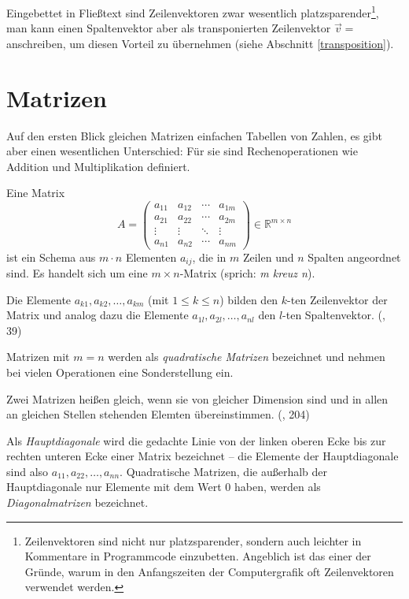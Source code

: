 Eingebettet in Fließtext sind Zeilenvektoren zwar wesentlich platzsparender\footnote{Zeilenvektoren sind nicht nur platzsparender, sondern auch leichter in Kommentare in 
Programmcode einzubetten. Angeblich ist das einer der Gründe, warum in den Anfangszeiten der Computergrafik oft Zeilenvektoren verwendet werden.
}, man kann einen Spaltenvektor aber als transponierten Zeilenvektor $\vec{v} = $  anschreiben, um diesen Vorteil zu übernehmen (siehe Abschnitt \ref{transposition}).


\section{Matrizen}
Auf den ersten Blick gleichen Matrizen einfachen Tabellen von Zahlen, es gibt aber einen wesentlichen Unterschied: Für sie sind Rechenoperationen wie Addition und Multiplikation definiert.

Eine Matrix
\begin{equation}
 A = \begin{pmatrix}
   a_{11} & a_{12} & \cdots & a_{1m}\\
   a_{21} & a_{22} & \cdots & a_{2m}\\
   \vdots & \vdots & \ddots & \vdots\\
   a_{n1} & a_{n2} & \cdots & a_{nm}
 \end{pmatrix}
 \in \mathbb{R}^{m \times n}
\end{equation}
ist ein Schema aus $m \cdot n$ Elementen $a_{ij}$, die in $m$ Zeilen und $n$ Spalten angeordnet sind. Es handelt sich um eine $m \times n$-Matrix (sprich: \emph{m kreuz n}).

Die Elemente $a_{k1}, a_{k2}, \ldots, a_{km}$ (mit $1 \leq k \leq n$) bilden den $k$-ten Zeilenvektor der Matrix und analog dazu die Elemente $a_{1l}, a_{2l}, \ldots, a_{nl}$ den $l$-ten Spaltenvektor. (\vgl \citep{optimierung}, 39)

Matrizen mit $m = n$ werden als \emph{quadratische Matrizen} bezeichnet und nehmen bei vielen Operationen eine Sonderstellung ein.

Zwei Matrizen heißen gleich, wenn sie von gleicher Dimension sind und in allen an gleichen Stellen stehenden Elemten übereinstimmen. (\vgl \citep{bronstein}, 204)

Als \emph{Hauptdiagonale} wird die gedachte Linie von der linken oberen Ecke bis zur rechten unteren Ecke einer Matrix bezeichnet -- die Elemente der Hauptdiagonale sind also $a_{11}, a_{22}, \ldots, a_{nn}$. Quadratische Matrizen, die außerhalb der Hauptdiagonale nur Elemente mit dem Wert $0$ haben, werden als \emph{Diagonalmatrizen} bezeichnet.

